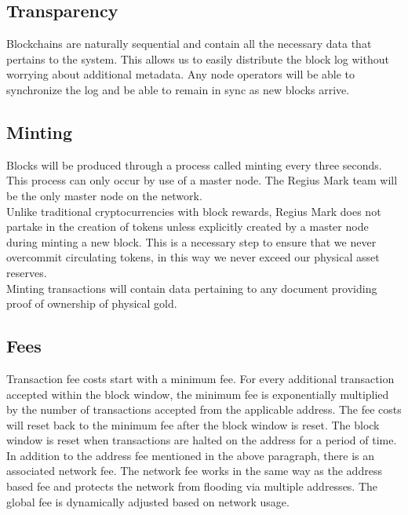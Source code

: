 \documentclass[12pt,a4paper]{article}
\begin{document}
  \subsection{Transparency}
  Blockchains are naturally sequential and contain all the necessary data that
  pertains to the system. This allows us to easily distribute the block log
  without worrying about additional metadata. Any node operators will be able to
  synchronize the log and be able to remain in sync as new blocks arrive.

  \subsection{Minting}
  Blocks will be produced through a process called minting every three seconds.
  This process can only occur by use of a master node. The Regius Mark team will
  be the only master node on the network.\\

  Unlike traditional cryptocurrencies with block rewards, Regius Mark does not
  partake in the creation of tokens unless explicitly created by a master node
  during minting a new block. This is a necessary step to ensure that we never
  overcommit circulating tokens, in this way we never exceed our physical asset
  reserves.\\

  Minting transactions will contain data pertaining to any document providing
  proof of ownership of physical gold.

  \subsection{Fees}
  Transaction fee costs start with a minimum fee. For every additional
  transaction accepted within the block window, the minimum fee is exponentially
  multiplied by the number of transactions accepted from the applicable address.
  The fee costs will reset back to the minimum fee after the block window is
  reset. The block window is reset when transactions are halted on the address
  for a period of time.\\

  In addition to the address fee mentioned in the above paragraph, there is an
  associated  network fee. The network fee works in the same way as
  the address based fee and protects the network from flooding via multiple
  addresses. The global fee is dynamically adjusted based on network usage.\\
\end{document}
